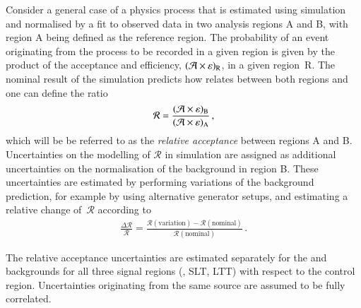 Consider a general case of a physics process that is estimated using
simulation and normalised by a fit to observed data in two analysis
regions A and B, with region A being defined as the reference
region. The probability of an event originating from the process to be
recorded in a given region is given by the product of the acceptance
and efficiency, $(\mathcal{A} \times \varepsilon)_{\text{R}}$, in a given region~R. The
nominal result of the simulation predicts how \AccTimesEff relates
between both regions and one can define the ratio
\begin{align*}
  \mathcal{R} = \frac{(\mathcal{A} \times \varepsilon)_{\text{B}}}{(\mathcal{A} \times \varepsilon)_{\text{A}}} \,\text{,}
\end{align*}
which will be be referred to as the \emph{relative acceptance} between
regions A and B. Uncertainties on the modelling of $\mathcal{R}$ in
simulation are assigned as additional uncertainties on the
normalisation of the background in region B. These uncertainties are estimated by performing
variations of the background prediction, for example by using
alternative generator setups, and estimating a relative change
of~$\mathcal{R}$ according to
\begin{align*}
  \frac{\Delta \mathcal{R}}{\mathcal{R}} = \frac{\mathcal{R}(\text{variation}) - \mathcal{R}(\text{nominal})}{\mathcal{R}(\text{nominal})} \,\text{.}
\end{align*}




The relative acceptance uncertainties are estimated separately for the
\ZHF and \ttbar backgrounds for all three signal regions (\hadhad,
\lephad SLT, \lephad LTT) with respect to the \ZHF control
region. Uncertainties originating from the same source are assumed to
be fully correlated.

